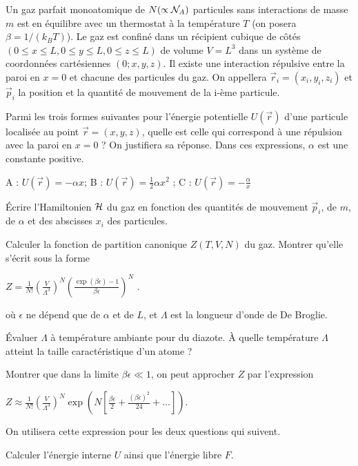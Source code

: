 Un gaz parfait monoatomique de $N (\propto {\cal N}_A)$ particules sans interactions de masse $m$ est en équilibre avec un thermostat à la
température $T$ (on posera $\beta =1/(k_B T)$). Le gaz est confiné dans un récipient cubique de côtés $(0 \le x \le L,  0 \le y \le L, 0 \le z \le L)$ de volume $V = L^3$ dans un système de coordonnées cartésiennes $(0; x, y, z)$. Il existe une interaction répulsive entre la  paroi en $x = 0$ et chacune des particules du gaz. On appellera
$\vec{r}_i=(x_i,y_i,z_i)$ et $\vec{p}_i$ la position et la quantité de mouvement de la i-\`eme particule.


\question
Parmi les trois formes suivantes pour l’énergie potentielle $U(\vec{r})$ d’une particule localisée au point $\vec{r}=(x,y,z)$, quelle est celle qui correspond à une répulsion avec la paroi en $x = 0$ ? On justifiera sa réponse. Dans ces expressions, $\alpha$ est une constante positive.
\begin{center}
A : $U(\vec{r})=-\alpha x$; B : $U(\vec{r})=\frac{1}{2} \alpha x^2$ ; C : $U(\vec{r})=-\frac{\alpha}{x}$
\end{center}


\question
Écrire l'Hamiltonien ${\cal H}$ du gaz en fonction des quantités de mouvement $\vec{p}_i$, de $m$, de $\alpha$ et des abscisses $x_i$ des particules.


\question
Calculer la fonction de partition canonique $Z(T,V,N)$ du gaz. Montrer qu'elle s’écrit sous la forme
\begin{center}
    $Z =\frac{1}{N!}(\frac{V}{\Lambda^3})^N \left( \frac{\exp(\beta \epsilon)-1}{\beta \epsilon} \right)^N$ .
\end{center}
où $\epsilon$ ne dépend que de $\alpha$ et de  $L$, et $\Lambda$ est la longueur d'onde de De Broglie. 


\question
\'Evaluer $\Lambda$ à température ambiante pour du diazote. \`A quelle température $\Lambda$ atteint la taille caractéristique d'un atome ?


\question Montrer que dans la limite $\beta \epsilon \ll 1$, on peut approcher $Z$ par l'expression

\begin{center}
    $Z \approx \frac{1}{N!}(\frac{V}{\Lambda^3})^N \exp(N[\frac{\beta \epsilon}{2}+\frac{(\beta \epsilon)^2}{24}+\ldots])$.
\end{center}

On utilisera cette expression pour les deux questions qui suivent.

\question Calculer l’énergie interne $U$ ainsi que l’énergie libre $F$.

